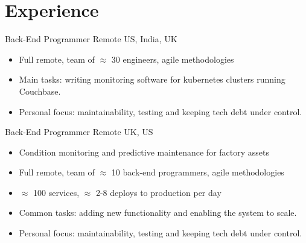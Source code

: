 \documentclass[12pt,a4paper]{moderncv}
\begin{document}


\newpage

\section{Experience}

  {Back-End Programmer}
  {\href{https://www.couchbase.com/}{\color{link}{Couchbase}}}
  {Remote}
  {US, India, UK}
  {
  \begin{itemize}
    \item Full remote, team of $\approx$ 30 engineers, agile methodologies
    \item Main tasks: writing monitoring software for kubernetes clusters running Couchbase.
    \item Personal focus: maintainability, testing and keeping tech debt under control.
  \end{itemize}
}

  {Back-End Programmer}
  {\href{https://www.senseye.io}{\color{link}{Senseye}}}
  {Remote}
  {UK, US}
  {
  \begin{itemize}
    \item Condition monitoring and predictive maintenance for factory assets
    \item Full remote, team of $\approx$ 10 back-end programmers, agile methodologies
    \item $\approx$ 100 services, $\approx$ 2-8 deploys to production per day
    \item Common tasks:
      adding new functionality
      and enabling the system to scale.
    \item Personal focus: maintainability, testing and keeping tech debt under control.
  \end{itemize}
}
\end{document}
